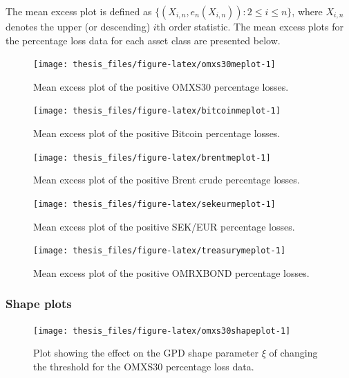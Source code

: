 \documentclass[a4paper,11pt]{article}
\theoremstyle{definition}
\theoremstyle{definition}
\theoremstyle{definition}
\theoremstyle{definition}
\theoremstyle{remark}
\begin{document}
The mean excess plot is defined as \(\{(X_{i, n}, e_n (X_{i, n})): 2 \leq i \leq n \}\), where \(X_{i, n}\) denotes the upper (or descending) \(i\)th order statistic. The mean excess plots for the percentage loss data for each asset class are presented below.
\begin{figure}[H]

{\centering \texttt{[image: thesis\_files/figure-latex/omxs30meplot-1]} 

}

\caption{Mean excess plot of the positive OMXS30 percentage losses.}\label{fig:omxs30meplot}
\end{figure}
\begin{figure}[H]

{\centering \texttt{[image: thesis\_files/figure-latex/bitcoinmeplot-1]} 

}

\caption{Mean excess plot of the positive Bitcoin percentage losses.}\label{fig:bitcoinmeplot}
\end{figure}
\begin{figure}[H]

{\centering \texttt{[image: thesis\_files/figure-latex/brentmeplot-1]} 

}

\caption{Mean excess plot of the positive Brent crude percentage losses.}\label{fig:brentmeplot}
\end{figure}
\begin{figure}[H]

{\centering \texttt{[image: thesis\_files/figure-latex/sekeurmeplot-1]} 

}

\caption{Mean excess plot of the positive SEK/EUR percentage losses.}\label{fig:sekeurmeplot}
\end{figure}
\begin{figure}[H]

{\centering \texttt{[image: thesis\_files/figure-latex/treasurymeplot-1]} 

}

\caption{Mean excess plot of the positive OMRXBOND percentage losses.}\label{fig:treasurymeplot}
\end{figure}
\hypertarget{sec:shapeplots}{%
\subsubsection{Shape plots}\label{sec:shapeplots}}
\begin{figure}[H]

{\centering \texttt{[image: thesis\_files/figure-latex/omxs30shapeplot-1]} 

}

\caption{Plot showing the effect on the GPD shape parameter $\xi$ of changing the threshold for the OMXS30 percentage loss data.}\label{fig:omxs30shapeplot}
\end{figure}
\end{document}
